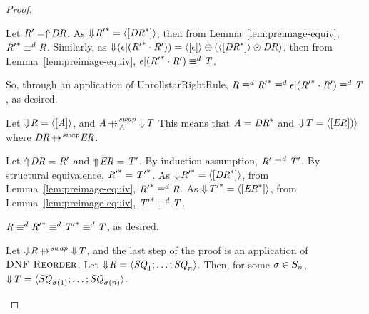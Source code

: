 \documentclass[numbers,10pt,preprint\ifanon ,nocopyrightspace\fi]{sigplanconf}
\begin{document}
\begin{proof}
\begin{case}[\AtomUnrollstarRightRule{}]
    Let $\mathit{R}' = \Uparrow\mkern-4mu \mathit{DR}$.
    As $\Downarrow\mkern-4mu {\mathit{R}'}^* =
    \langle[{\mathit{DR}}^*]\rangle$, then from
    Lemma~\ref{lem:preimage-equiv}, ${\mathit{R}'}^*
    \equiv^d \mathit{R}$.
    Similarly, as $\Downarrow\mkern-4mu (\epsilon |
      ({\mathit{R}'}^*\cdot\mathit{R}')) =
    \langle[\epsilon]\rangle\oplus(\langle[{\mathit{DR}}^*]\rangle\odot\mathit{DR})$,
    then from
    Lemma~\ref{lem:preimage-equiv}, $\epsilon |
    ({\mathit{R}'}^*\cdot\mathit{R}') \equiv^d \mathit{T}$.
  
    So, through an application of UnrollstarRightRule{},
    $\mathit{R} \equiv^d {\mathit{R}'}^* \equiv^d
    \epsilon |
    ({\mathit{R}'}^*\cdot\mathit{R}') \equiv^d \mathit{T}$, as desired.
  \end{case}
  
  \begin{case}[\ParallelSwapAtomStructuralRewriteRule{}]
    Let $\Downarrow\mkern-4mu \mathit{R} = \langle[\mathit{A}]\rangle$, and
    $\Atom \ParallelRewriteSwapAtom \ToDNFRegexOf{\RegexAlt}$
    This means that $\mathit{A} = {\mathit{DR}}^*$ and
    $\Downarrow\mkern-4mu \mathit{T} =
    \langle[\mathit{ER}])\rangle$ where $\DNFRegex \ParallelRewriteSwap
    \DNFRegexAlt$.

    Let $\Uparrow\mkern-4mu \mathit{DR} = \mathit{R}'$ and
    $\Uparrow\mkern-4mu \mathit{ER} = \mathit{T}'$.  By induction assumption, $\mathit{R}'
    \equiv^d \mathit{T}'$.  By structural equivalence,
    ${\mathit{R}'}^* = {\mathit{T}'}^*$.
    As $\Downarrow\mkern-4mu {\mathit{R}'}^* =
    \langle[{\mathit{DR}}^*]\rangle$, from
    Lemma~\ref{lem:preimage-equiv}, ${\mathit{R}'}^* \equiv^d
    \mathit{R}$.
    As $\Downarrow\mkern-4mu {\mathit{T}'}^* =
    \langle[{\mathit{ER}}^*]\rangle$, from
    Lemma~\ref{lem:preimage-equiv}, ${\mathit{T}'}^* \equiv^d
    \mathit{T}$.

    $\mathit{R} \equiv^d {\mathit{R}'}^* \equiv^d
    {\mathit{T}'}^* \equiv^d \mathit{T}$, as desired.
  \end{case}

  \begin{case}[\DNFReorderRule{}]
    Let $\ToDNFRegexOf{\Regex} \ParallelRewriteSwap \ToDNFRegexOf{\RegexAlt}$,
    and the last step of the proof is an application of $\textsc{DNF Reorder}$.
    Let $\Downarrow\mkern-4mu \mathit{R} = \langle\mathit{SQ}_1;\ldots;\mathit{SQ}_n\rangle$.  Then,
    for some $\sigma\in S_{n}$,
    $\Downarrow\mkern-4mu \mathit{T} =
    \langle\mathit{SQ}_{\sigma(1)};\ldots;\mathit{SQ}_{\sigma(n)}\rangle$.


\end{case}
\end{proof}
\end{document}
